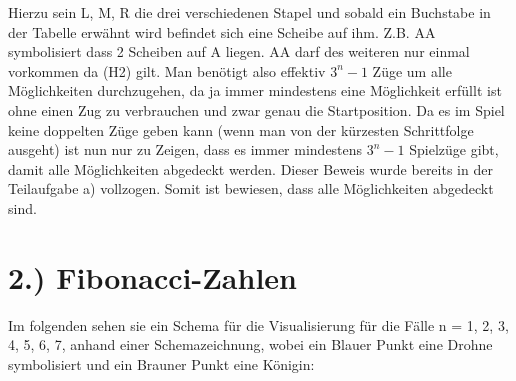 \documentclass[titlepage]{article}
\begin{document}
		\noindent
		Hierzu sein L, M, R die drei verschiedenen Stapel und sobald ein Buchstabe in der Tabelle erwähnt wird befindet sich eine Scheibe auf ihm. Z.B. AA symbolisiert dass 2 Scheiben auf A liegen. AA darf des weiteren nur einmal vorkommen da (H2) gilt. Man benötigt also effektiv $3^n-1$ Züge um alle Möglichkeiten durchzugehen, da ja immer mindestens eine Möglichkeit erfüllt ist ohne einen Zug zu verbrauchen und zwar genau die Startposition. Da es im Spiel keine doppelten Züge geben kann (wenn man von der kürzesten Schrittfolge ausgeht) ist nun nur zu Zeigen, dass es immer mindestens $3^n-1$ Spielzüge gibt, damit alle Möglichkeiten abgedeckt werden. Dieser Beweis wurde bereits in der Teilaufgabe a) vollzogen. Somit ist bewiesen, dass alle Möglichkeiten abgedeckt sind.
	\section*{2.) Fibonacci-Zahlen}
	Im folgenden sehen sie ein Schema für die Visualisierung für die Fälle n = 1, 2, 3, 4, 5, 6, 7, anhand einer Schemazeichnung, wobei ein Blauer Punkt eine Drohne symbolisiert und ein Brauner Punkt eine Königin:\\\\
\end{document}
